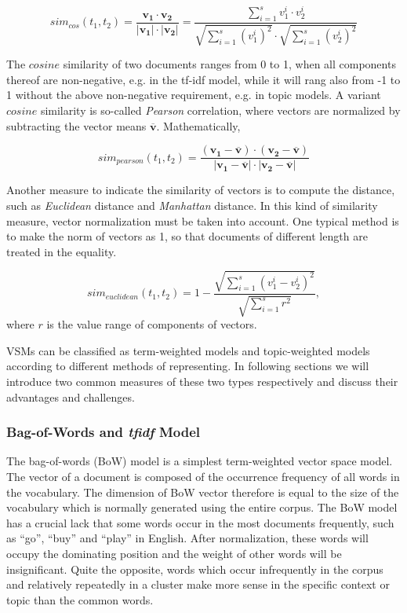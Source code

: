 \begin{equation}
    sim_{cos}(t_1, t_2) = \frac{\mathbf{v_1} \cdot \mathbf{v_2}}{|\mathbf{v_1}| \cdot |\mathbf{v_2}|} = \frac{\sum_{i=1}^s v_1^i \cdot v_2^i}{\sqrt{\sum_{i=1}^s (v_1^i)^2} \cdot \sqrt{\sum_{i=1}^s (v_2^i)^2}}
\end{equation}

The $cosine$ similarity of two documents ranges from 0 to 1, when all components thereof are non-negative, e.g. in the tf-idf model, while it will rang also from -1 to 1 without the above non-negative requirement, e.g. in topic models. A variant $cosine$ similarity is so-called \textit{Pearson} correlation, where vectors are normalized by subtracting the vector means $\mathbf{\overline{v}}$.  Mathematically, 

\begin{equation}
    sim_{pearson}(t_1, t_2) = \frac{(\mathbf{v_1-\overline{v}}) \cdot (\mathbf{v_2-\overline{v}})}{|\mathbf{v_1-\overline{v}}| \cdot |\mathbf{v_2}-\mathbf{\overline{v}}|}
\end{equation}

Another measure to indicate the similarity of vectors is to compute the distance, such as \textit{Euclidean} distance and \textit{Manhattan} distance. In this kind of similarity measure, vector normalization must be taken into account. One typical method is to make the norm of vectors as 1, so that documents of different length are treated in the equality. 

\begin{equation}
    sim_{euclidean}(t_1, t_2) = 1 - \frac{\sqrt{\sum_{i=1}^s (v_1^i-v_2^i)^2}}{\sqrt{\sum_{i=1}^s r^2}} ,
\end{equation}
where $r$ is the value range of components of vectors.

VSMs can be classified as term-weighted models and topic-weighted models according to different methods of representing. In following sections we will introduce two common measures of these two types respectively and discuss their advantages and challenges. 

\subsubsection{Bag-of-Words and \textit{tfidf} Model}

The bag-of-words (BoW) model is a simplest term-weighted vector space model. The vector of a document is composed of the occurrence frequency of all words in the vocabulary. The dimension of BoW vector therefore is equal to the size of the vocabulary which is normally generated using the entire corpus. The BoW model has a crucial lack that some words occur in the most documents frequently, such as ``go'', ``buy'' and ``play'' in English. After normalization, these words will occupy the dominating position and the weight of other words will be	insignificant. Quite the opposite, words which occur infrequently in the corpus and relatively repeatedly in a cluster make more sense in the specific context or topic than the common words. 

